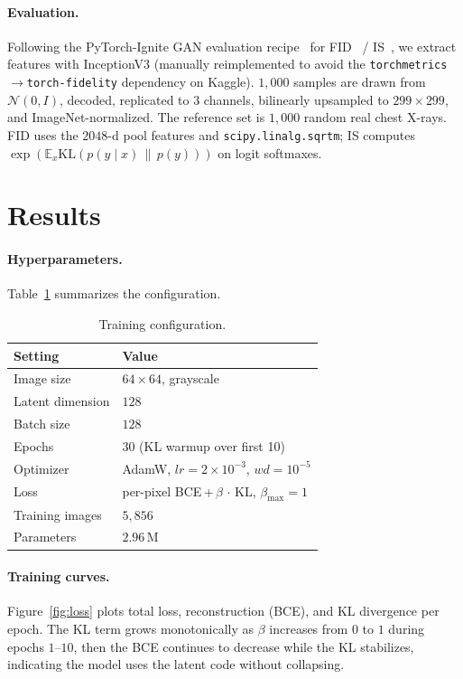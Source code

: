 \documentclass{article}
\begin{document}
\paragraph{Evaluation.} Following the PyTorch-Ignite GAN evaluation
recipe~\cite{ignite_gan_eval} for FID~\cite{heusel2017} / IS~\cite{salimans2016}, we
extract features with InceptionV3 (manually reimplemented to avoid the
\texttt{torchmetrics}$\rightarrow$\texttt{torch-fidelity} dependency on Kaggle). $1{,}000$
samples are drawn from $\mathcal{N}(0,I)$, decoded, replicated to $3$ channels, bilinearly
upsampled to $299{\times}299$, and ImageNet-normalized. The reference set is $1{,}000$
random real chest X-rays. FID uses the $2048$-d pool features and
\texttt{scipy.linalg.sqrtm}; IS computes
$\exp\!\left(\mathbb{E}_x \mathrm{KL}\!\left(p(y\!\mid\!x)\,\|\,p(y)\right)\right)$ on logit softmaxes.

\section{Results}

\paragraph{Hyperparameters.} Table~\ref{tab:hparams} summarizes the configuration.

\begin{table}[h]
\centering
\caption{Training configuration.}
\label{tab:hparams}
\begin{tabular}{ll}
\toprule
Setting & Value \\
\midrule
Image size & $64{\times}64$, grayscale \\
Latent dimension & $128$ \\
Batch size & $128$ \\
Epochs & $30$ (KL warmup over first 10) \\
Optimizer & AdamW, $lr=2{\times}10^{-3}$, $wd=10^{-5}$ \\
Loss & per-pixel BCE\,+\,$\beta\,\cdot$\,KL, $\beta_{\max}=1$ \\
Training images & $5{,}856$ \\
Parameters & $2.96$\,M \\
\bottomrule
\end{tabular}
\end{table}

\paragraph{Training curves.} Figure~\ref{fig:loss} plots total loss, reconstruction
(BCE), and KL divergence per epoch. The KL term grows monotonically as $\beta$ increases
from $0$ to $1$ during epochs $1$--$10$, then the BCE continues to decrease while the KL
stabilizes, indicating the model uses the latent code without collapsing.
\end{document}
